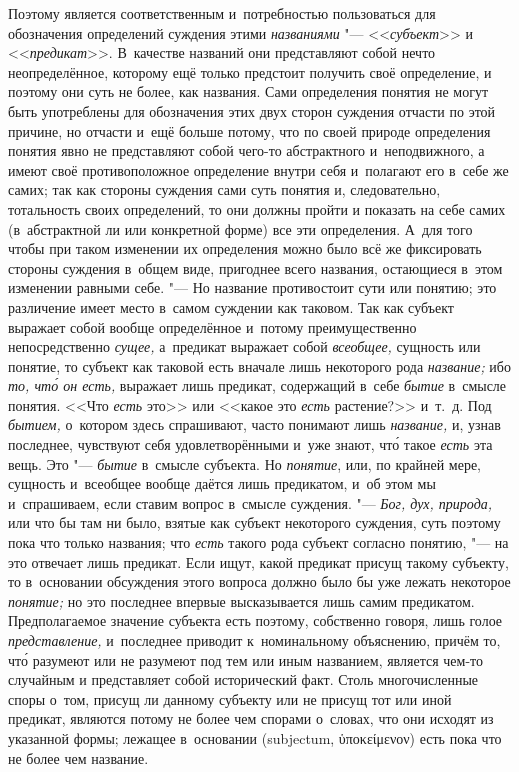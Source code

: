 Поэтому является соответственным и~потребностью пользоваться
для обозначения определений суждения этими
{\em названиями} "--- <<{\em субъект}>> и <<{\em предикат}>>.
В~качестве названий они представляют собой нечто
неопределённое, которому ещё только предстоит получить своё определение, и
поэтому они суть не более, как названия. Сами определения понятия не могут
быть употреблены для обозначения этих двух сторон суждения отчасти по этой
причине, но отчасти и~ещё больше потому, что по своей природе определения
понятия явно не представляют собой чего-то абстрактного и~неподвижного, а
имеют своё противоположное определение внутри себя и~полагают его в~себе же
самих; так как стороны суждения сами суть понятия и,
следовательно, тотальность своих определений, то они должны пройти и
показать на себе самих (в~абстрактной ли или конкретной форме) все эти
определения. А~для того чтобы при таком изменении их определения можно было
всё же фиксировать стороны суждения в~общем виде, пригоднее всего названия,
остающиеся в~этом изменении равными себе. "--- Но название
противостоит сути или понятию; это различение имеет место в~самом суждении
как таковом. Так как субъект выражает собой вообще определённое и~потому
преимущественно непосредственно {\em сущее,} а~предикат
выражает собой {\em всеобщее,}
сущность или понятие, то субъект как таковой есть вначале
лишь некоторого рода {\em название;} ибо {\em то, чт\'{о} он есть,}
выражает лишь предикат, содержащий в~себе {\em бытие} в~смысле
понятия. <<Что {\em есть} это>> или <<какое это {\em есть} растение?>>
и~т.~д. Под {\em бытием,}
о~котором здесь спрашивают, часто понимают лишь {\em название,} и, узнав
последнее, чувствуют себя удовлетворёнными и~уже знают, чт\'{о} такое
{\em есть} эта вещь. Это "--- {\em бытие} в~смысле субъекта. Но
{\em понятие},
или, по крайней мере, сущность и~всеобщее вообще даётся лишь
предикатом, и~об этом мы и~спрашиваем, если ставим вопрос в~смысле
суждения. "--- {\em Бог, дух, природа,} или что бы
там ни было, взятые как субъект некоторого суждения, суть поэтому пока что
только названия; что {\em есть} такого рода субъект согласно понятию, "--- на
это отвечает лишь предикат. Если ищут, какой предикат присущ такому субъекту,
то в~основании обсуждения этого вопроса должно было бы уже лежать некоторое
{\em понятие;} но это последнее впервые высказывается лишь
самим предикатом. Предполагаемое значение субъекта есть
поэтому, собственно говоря, лишь голое {\em представление,}
и~последнее приводит к~номинальному объяснению, причём то, чт\'{о} разумеют
или не разумеют под тем или иным названием, является чем-то случайным и
представляет собой исторический факт. Столь многочисленные споры о~том,
присущ ли данному субъекту или не присущ тот или иной предикат, являются
потому не более чем спорами о~словах, что они исходят из указанной формы;
лежащее в~основании (subjectum, \textgreek{ὑποκείμενον}) есть пока
что не более чем название.

